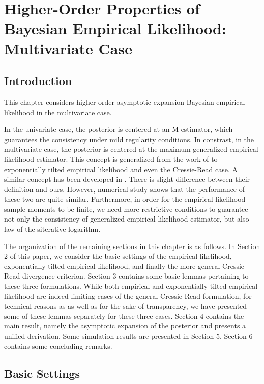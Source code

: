 \chapter{Higher-Order Properties of Bayesian Empirical Likelihood: Multivariate
Case}


\section{Introduction}
This chapter considers higher order asymptotic expansion Bayesian empirical likelihood in the multivariate case.

In the univariate case, the posterior is centered at an M-estimator,
which guarantees the consistency under mild regularity conditions. In constrast,
in the
multivariate case, the posterior is centered at the maximum generalized
empirical likelihood estimator. This concept is generalized from 
the work of \citet{qin1994empirical}
to exponentially tilted empirical likelihood and even the Cressie-Read
case. A similar concept has been developed in \citet{newey2004higher}
. There is slight difference between their definition
and ours. However, numerical
study shows that the performance of these two are quite similar. Furthermore,
in order for the empirical likelihood sample moments to be finite,
we need more restrictive conditions to guarantee not only the consistency
of generalized empirical likelihood estimator, but also law of
the siterative logarithm. 

The organization of the remaining sections in this chapter is as follows.
In Section 2 of this paper, we consider the basic settings of the
empirical likelihood, exponentially tilted empirical likelihood, and
finally the more general Cressie-Read divergence criterion. Section
3 contains some basic lemmas pertaining to these three formulations.
While both empirical and exponentially tilted empirical likelihood
are indeed limiting cases of the general Cressie-Read formulation,
for technical reasons as as well as for the sake of transparency,
we have presented some of these lemmas separately for these three
cases. Section 4 contains the main result, namely the asymptotic expansion
of the posterior and presents a unified derivation. Some simulation
results are presented in Section 5. Section 6 contains some concluding
remarks.


\section{Basic Settings}

